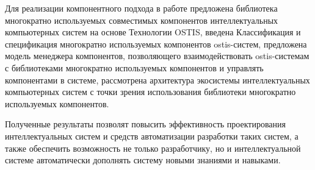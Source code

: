 Для реализации компонентного подхода в работе предложена библиотека многократно используемых совместимых компонентов интеллектуальных компьютерных систем на основе Технологии OSTIS, введена Классификация и спецификация многократно используемых компонентов ostis-систем, предложена модель менеджера компонентов, позволяющего взаимодействовать ostis-системам с библиотеками многократно используемых компонентов и управлять компонентами в системе, рассмотрена архитектура экосистемы интеллектуальных компьютерных систем с точки зрения использования библиотеки многократно используемых компонентов.

Полученные результаты позволят повысить эффективность проектирования интеллектуальных систем и средств автоматизации разработки таких систем, а также обеспечить возможность не только разработчику, но и интеллектуальной системе автоматически дополнять систему новыми знаниями и навыками.

%